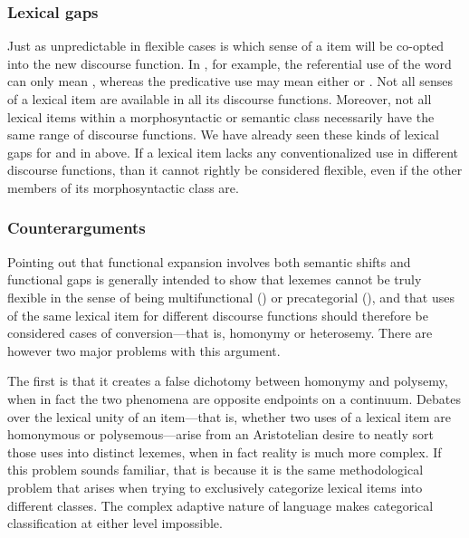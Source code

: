 \subsubsection{Lexical gaps}
\label{sec:2.3.3.3}

Just as unpredictable in flexible cases is which sense of a item will be co-opted into the new discourse function. In , for example, the referential use of the word  can only mean , whereas the predicative use may mean either  or  \parencite[91]{Kihm2017}. Not all senses of a lexical item are available in all its discourse functions. Moreover, not all lexical items within a morphosyntactic or semantic class necessarily have the same range of discourse functions. We have already seen these kinds of lexical gaps for  and  in  above. If a lexical item lacks any conventionalized use in different discourse functions, than it cannot rightly be considered flexible, even if the other members of its morphosyntactic class are.

\subsubsection{Counterarguments}
\label{sec:2.3.3.4}

Pointing out that functional expansion involves both semantic shifts and functional gaps is generally intended to show that lexemes cannot be truly flexible in the sense of being multifunctional () or precategorial (), and that uses of the same lexical item for different discourse functions should therefore be considered cases of conversion—that is, homonymy or heterosemy. There are however two major problems with this argument.

The first is that it creates a false dichotomy between homonymy and polysemy, when in fact the two phenomena are opposite endpoints on a continuum. Debates over the lexical unity of an item—that is, whether two uses of a lexical item are homonymous or polysemous—arise from an Aristotelian desire to neatly sort those uses into distinct lexemes, when in fact reality is much more complex. If this problem sounds familiar, that is because it is the same methodological problem that arises when trying to exclusively categorize lexical items into different classes. The complex adaptive nature of language makes categorical classification at either level impossible.

